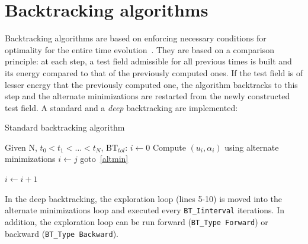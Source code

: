 \documentclass[10pt,oneside]{memoir}
\begin{document}
\section{Backtracking algorithms}
\label{sec:BT}
Backtracking algorithms are based on enforcing necessary conditions for optimality for the entire time evolution~\cite{Bourdin-2007a}. They are based on a comparison principle: at each step, a test field admissible for all previous times is built and its energy compared to that of the previously computed ones. If the test field is of lesser energy that the previously computed one, the algorithm backtracks to this step and the alternate minimizations are restarted from the newly constructed test field. A standard and a \emph{deep} backtracking are implemented:

\begin{algorithm}
	\caption{Standard backtracking algorithm}
	\label{algo:StdBT}
		\begin{algorithmic}[1]
			\State Given N, $t_0 < t_1 < \dots < t_N$, $\mathrm{BT}_{tol}$:
			\State $i \leftarrow 0$
			\Repeat
				\State Compute $(u_i,\alpha_i)$ using alternate minimizations\label{altmin}
						\State $i \leftarrow j$
						\State goto~\ref{altmin}
					\EndIf	
				\EndFor
				
			\State $i \leftarrow i+1$
		\end{algorithmic}
\end{algorithm}

In the deep backtracking, the exploration loop (lines 5-10) is moved into the alternate minimizations loop and executed every \verb+BT_Iinterval+ iterations. In addition, the exploration loop can be run forward (\verb+BT_Type Forward+) or backward (\verb+BT_Type Backward+).
\end{document}
